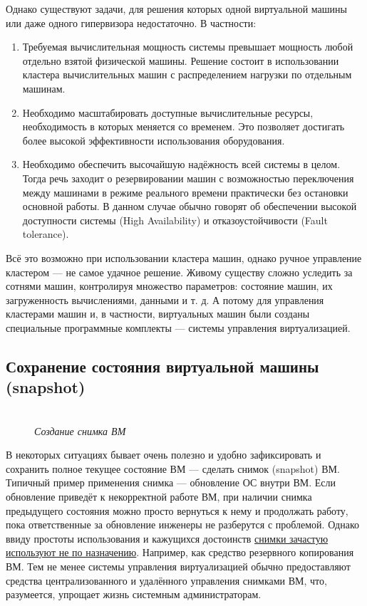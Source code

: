 \documentclass[14pt, a4paper]{article}
\begin{document}
Однако существуют задачи, для решения которых одной виртуальной машины или даже одного
гипервизора недостаточно. В частности:
\begin{enumerate}
    \item Требуемая вычислительная мощность системы превышает мощность любой отдельно взятой
    физической машины. Решение состоит в использовании кластера вычислительных машин с
    распределением нагрузки по отдельным машинам.
    \item Необходимо масштабировать доступные вычислительные ресурсы, необходимость в которых
    меняется со временем. Это позволяет достигать более высокой эффективности
    использования оборудования.
    \item Необходимо обеспечить высочайшую надёжность всей системы в целом. Тогда речь заходит о
    резервировании машин с возможностью переключения между машинами в режиме реального
    времени практически без остановки основной работы. В данном случае обычно говорят об
    обеспечении высокой доступности системы (High Availability) и отказоустойчивости (Fault
    tolerance).
\end{enumerate}

Всё это возможно при использовании кластера машин, однако ручное управление кластером — не
самое удачное решение. Живому существу сложно уследить за сотнями машин, контролируя
множество параметров: состояние машин, их загруженность вычислениями, данными и т. д. А потому
для управления кластерами машин и, в частности, виртуальных машин были созданы специальные
программные комплекты — системы управления виртуализацией.

\subsection*{Сохранение состояния виртуальной машины (snapshot)} 

\begin{figure}[h]
    \centering
    \\ 
    \small\textit{Создание снимка ВМ}  
    \label{framework} 
\end{figure}

В некоторых ситуациях бывает очень полезно и удобно зафиксировать и сохранить полное текущее
состояние ВМ — сделать снимок (snapshot) ВМ. Типичный пример применения снимка — обновление
ОС внутри ВМ. Если обновление приведёт к некорректной работе ВМ, при наличии снимка
предыдущего состояния можно просто вернуться к нему и продолжать работу, пока ответственные за
обновление инженеры не разберутся с проблемой. Однако ввиду простоты использования и
кажущихся достоинств \href{https://www.vmgu.ru/news/vmware-vsphere-esx-snapshots-are-bad}{снимки зачастую используют не по назначению}. Например, как средство
резервного копирования ВМ. Тем не менее системы управления виртуализацией обычно
предоставляют средства централизованного и удалённого управления снимками ВМ, что, разумеется,
упрощает жизнь системным администраторам.
\end{document}

